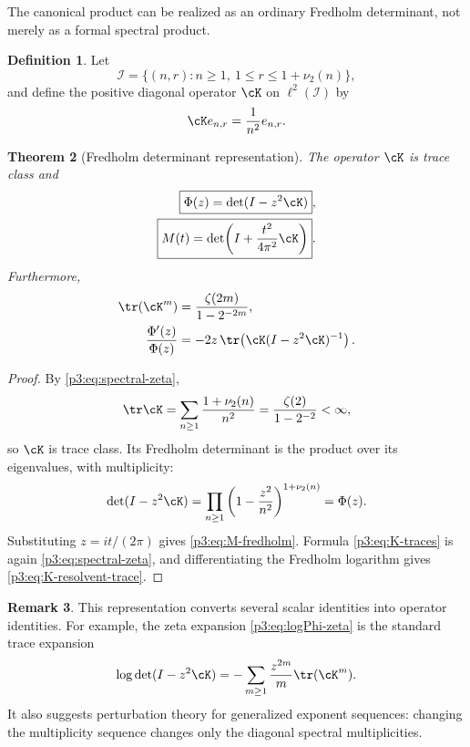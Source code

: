 \documentclass[11pt,oneside]{article}
\newtheorem{theorem}{Theorem}[section]
\theoremstyle{definition}
\newtheorem{definition}[theorem]{Definition}
\newtheorem{remark}[theorem]{Remark}
\begin{document}
The canonical product can be realized as an ordinary Fredholm determinant, not merely as a
formal spectral product.

\begin{definition}
Let
\begin{equation}
 \mathcal I=\{(n,r):n\ge1,\ 1\le r\le 1+\nu_2(n)\},
\end{equation}
and define the positive diagonal operator \(\cK\) on \(\ell^2(\mathcal I)\) by
\begin{equation}
 \cK e_{n,r}=\frac1{n^2}e_{n,r}.                             \label{p3:eq:K-def}
\end{equation}
\end{definition}

\begin{theorem}[Fredholm determinant representation]\label{p3:thm:fredholm}
The operator \(\cK\) is trace class and
\begin{align}
 \boxed{\Phi(z)=\det(I-z^2\cK)},                             \label{p3:eq:Phi-fredholm}\\
 \boxed{M(t)=\det\!\left(I+\frac{t^2}{4\pi^2}\cK\right)}.  \label{p3:eq:M-fredholm}
\end{align}
Furthermore,
\begin{align}
 \tr(\cK^m)&=\frac{\zeta(2m)}{1-2^{-2m}},                   \label{p3:eq:K-traces}\\
 \frac{\Phi'(z)}{\Phi(z)}
 &=-2z\,\tr\!\left(\cK(I-z^2\cK)^{-1}\right).            \label{p3:eq:K-resolvent-trace}
\end{align}
\end{theorem}

\begin{proof}
By \eqref{p3:eq:spectral-zeta},
\[
 \tr\cK=\sum_{n\ge1}\frac{1+\nu_2(n)}{n^2}
 =\frac{\zeta(2)}{1-2^{-2}}<\infty,
\]
so \(\cK\) is trace class.  Its Fredholm determinant is the product over its eigenvalues,
with multiplicity:
\[
 \det(I-z^2\cK)
 =\prod_{n\ge1}\left(1-\frac{z^2}{n^2}\right)^{1+\nu_2(n)}
 =\Phi(z).
\]
Substituting \(z=it/(2\pi)\) gives \eqref{p3:eq:M-fredholm}.  Formula
\eqref{p3:eq:K-traces} is again \eqref{p3:eq:spectral-zeta}, and differentiating the Fredholm
logarithm gives \eqref{p3:eq:K-resolvent-trace}.
\end{proof}

\begin{remark}
This representation converts several scalar identities into operator identities.  For
example, the zeta expansion \eqref{p3:eq:logPhi-zeta} is the standard trace expansion
\[
 \log\det(I-z^2\cK)=-\sum_{m\ge1}\frac{z^{2m}}m\tr(\cK^m).
\]
It also suggests perturbation theory for generalized exponent sequences: changing the
multiplicity sequence changes only the diagonal spectral multiplicities.
\end{remark}
\end{document}
